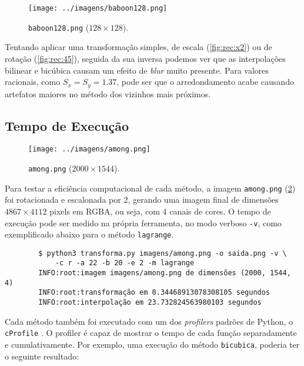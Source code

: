     \begin{figure}[H]
        \centering
        \texttt{[image: ../imagens/baboon128.png]}
        \caption{\texttt{baboon128.png} ($128 \times 128$).}
        \label{fig:baboon128}
    \end{figure}

    Tentando aplicar uma transformação simples, de escala (\cref{fig:rec:x2}) ou de rotação (\cref{fig:rec:45}), seguida da sua inversa podemos ver que as interpolações bilinear e bicúbica causam um efeito de \textit{blur} muito presente. Para valores racionais, como $S_x = S_y = 1.37$, pode ser que o arredondamento acabe causando artefatos maiores no método dos vizinhos mais próximos.

    

    

\subsection{Tempo de Execução}

    \begin{figure}[H]
        \centering
        \texttt{[image: ../imagens/among.png]}
        \caption{\texttt{among.png} ($2000 \times 1544$).}
        \label{fig:among}
    \end{figure}

    Para testar a eficiência computacional de cada método, a imagem \texttt{among.png} (\ref{fig:among}) foi rotacionada e escalonada por 2, gerando uma imagem final de dimensões $4867 \times 4112$ pixels em RGBA, ou seja, com 4 canais de cores. O tempo de execução pode ser medido na própria ferramenta, no modo verboso \texttt{-v}, como exemplificado abaixo para o método \texttt{lagrange}.

    \begin{verbatim}
        $ python3 transforma.py imagens/among.png -o saida.png -v \
            -c r -a 22 -b 20 -e 2 -m lagrange
        INFO:root:imagem imagens/among.png de dimensões (2000, 1544, 4)
        INFO:root:transformação em 0.34468913078308105 segundos
        INFO:root:interpolação em 23.732824563980103 segundos
    \end{verbatim}

    Cada método também foi executado com um dos \textit{profilers} padrões de Python, o \texttt{cProfile} \autocite{cprofile}. O profiler é capaz de mostrar o tempo de cada função separadamente e cumulativamente. Por exemplo, uma execução do método \texttt{bicubica}, poderia ter o seguinte resultado:

